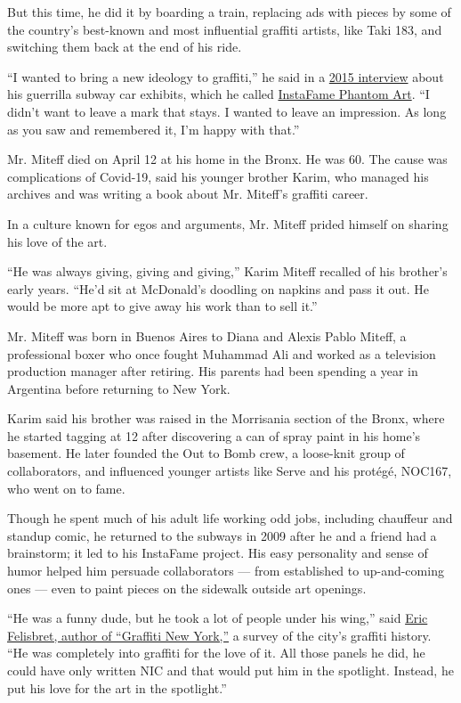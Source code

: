 But this time, he did it by boarding a train, replacing ads with pieces
by some of the country's best-known and most influential graffiti
artists, like Taki 183, and switching them back at the end of his ride.

``I wanted to bring a new ideology to graffiti,'' he said in a
\href{https://www.nytimes3xbfgragh.onion/2015/03/02/nyregion/a-graffiti-artist-turns-a-subway-car-into-a-gallery-until-the-end-of-the-line.html}{2015
interview} about his guerrilla subway car exhibits, which he called
\href{http://www.nic707.com/}{InstaFame Phantom Art}. ``I didn't want to
leave a mark that stays. I wanted to leave an impression. As long as you
saw and remembered it, I'm happy with that.''

Mr. Miteff died on April 12 at his home in the Bronx. He was 60. The
cause was complications of Covid-19, said his younger brother Karim, who
managed his archives and was writing a book about Mr. Miteff's graffiti
career.

In a culture known for egos and arguments, Mr. Miteff prided himself on
sharing his love of the art.

``He was always giving, giving and giving,'' Karim Miteff recalled of
his brother's early years. ``He'd sit at McDonald's doodling on napkins
and pass it out. He would be more apt to give away his work than to sell
it.''

Mr. Miteff was born in Buenos Aires to Diana and Alexis Pablo Miteff, a
professional boxer who once fought Muhammad Ali and worked as a
television production manager after retiring. His parents had been
spending a year in Argentina before returning to New York.

Karim said his brother was raised in the Morrisania section of the
Bronx, where he started tagging at 12 after discovering a can of spray
paint in his home's basement. He later founded the Out to Bomb crew, a
loose-knit group of collaborators, and influenced younger artists like
Serve and his protégé, NOC167, who went on to fame.

Though he spent much of his adult life working odd jobs, including
chauffeur and standup comic, he returned to the subways in 2009 after he
and a friend had a brainstorm; it led to his InstaFame project. His easy
personality and sense of humor helped him persuade collaborators ---
from established to up-and-coming ones --- even to paint pieces on the
sidewalk outside art openings.

``He was a funny dude, but he took a lot of people under his wing,''
said
\href{https://www.nytimes3xbfgragh.onion/2010/02/05/nyregion/05graffiti.html}{Eric
Felisbret, author of ``Graffiti New York,''} a survey of the city's
graffiti history. ``He was completely into graffiti for the love of it.
All those panels he did, he could have only written NIC and that would
put him in the spotlight. Instead, he put his love for the art in the
spotlight.''


